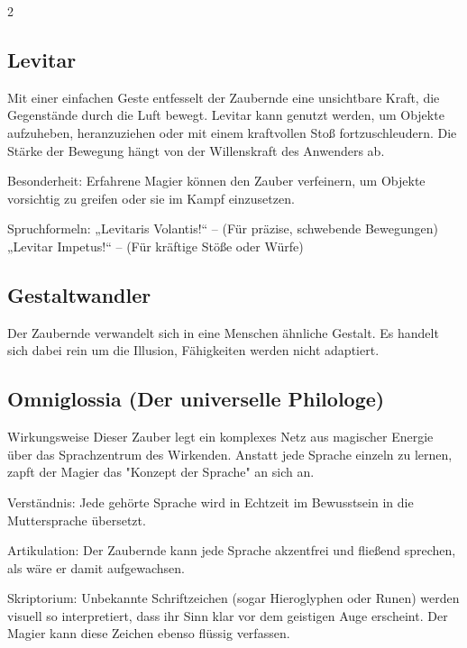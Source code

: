 \begin{multicols*}{2}


\subsection{Levitar}

Mit einer einfachen Geste entfesselt der Zaubernde eine unsichtbare Kraft, die Gegenstände durch die Luft bewegt. Levitar kann genutzt werden, um Objekte aufzuheben, heranzuziehen oder mit einem kraftvollen Stoß fortzuschleudern. Die Stärke der Bewegung hängt von der Willenskraft des Anwenders ab.

Besonderheit: Erfahrene Magier können den Zauber verfeinern, um Objekte vorsichtig zu greifen oder sie im Kampf einzusetzen.

Spruchformeln: „Levitaris Volantis!“ – (Für präzise, schwebende Bewegungen) „Levitar Impetus!“ – (Für kräftige Stöße oder Würfe)



\subsection{Gestaltwandler}

Der Zaubernde verwandelt sich in eine Menschen ähnliche Gestalt. Es handelt sich dabei rein um die Illusion, Fähigkeiten werden nicht adaptiert.



\subsection{Omniglossia (Der universelle Philologe)}

Wirkungsweise Dieser Zauber legt ein komplexes Netz aus magischer Energie über das Sprachzentrum des Wirkenden. Anstatt jede Sprache einzeln zu lernen, zapft der Magier das "Konzept der Sprache" an sich an.

Verständnis: Jede gehörte Sprache wird in Echtzeit im Bewusstsein in die Muttersprache übersetzt.

Artikulation: Der Zaubernde kann jede Sprache akzentfrei und fließend sprechen, als wäre er damit aufgewachsen.

Skriptorium: Unbekannte Schriftzeichen (sogar Hieroglyphen oder Runen) werden visuell so interpretiert, dass ihr Sinn klar vor dem geistigen Auge erscheint. Der Magier kann diese Zeichen ebenso flüssig verfassen.


\end{multicols*}
